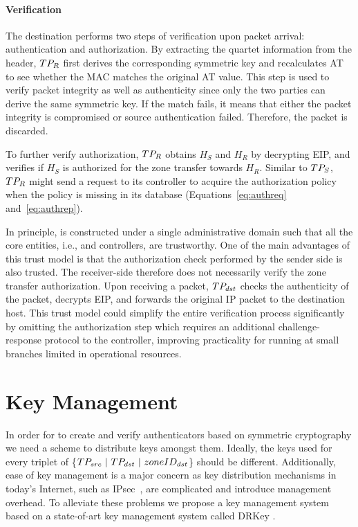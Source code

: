 

\paragraph{Verification}
The destination \tp performs two steps of verification upon packet arrival: authentication
and authorization. By extracting the quartet information from
the header, $TP_R$ first derives the corresponding symmetric key and recalculates AT to
see whether the MAC matches the original AT value. This step is used to verify packet
integrity as well as authenticity since only the two parties can derive the same
symmetric key. If the match fails, it means that either the packet integrity is compromised
or source authentication failed. Therefore, the packet is discarded.

To further verify authorization, $TP_R$ obtains $H_S$ and $H_R$ by decrypting EIP, and
verifies if $H_S$ is authorized for the zone transfer towards $H_R$. Similar to $TP_S$,
$TP_R$ might send a request to its controller to acquire the authorization policy when
the policy is missing in its database (Equations~\ref{eq:authreq} and~\ref{eq:authrep}).

In principle, \name is constructed under a single administrative domain such that all the
core entities, i.e., \tps and controllers, are trustworthy. One of the main advantages of
this trust model is that the authorization check performed by the sender side \tp is also
trusted. The receiver-side \tp therefore does not necessarily verify the zone transfer
authorization. Upon receiving a packet, $TP_{dst}$ checks the authenticity of the packet,
decrypts EIP, and forwards the original IP packet to the destination host. This trust
model could simplify the entire verification process significantly by omitting the
authorization step which requires an additional challenge-response protocol to the
controller, improving practicality for \tps running at small branches limited in
operational resources.

\section{Key Management}
\label{sec:keymanagement}

In order for \tps to create and verify authenticators based on symmetric cryptography
we need a scheme to distribute keys amongst them. Ideally, the keys used for every
triplet of \{$TP_{src}~|~TP_{dst}~|~zoneID_{dst}$\} should be different. Additionally,
ease of key management is a major concern as key distribution mechanisms in today's
Internet, such as IPsec~\cite{rfc2408,rfc2409,rfc4306}, are complicated and introduce
management overhead. To alleviate these problems we propose a key management system
based on a state-of-art key management system called DRKey \cite{rot2020piskes}.

